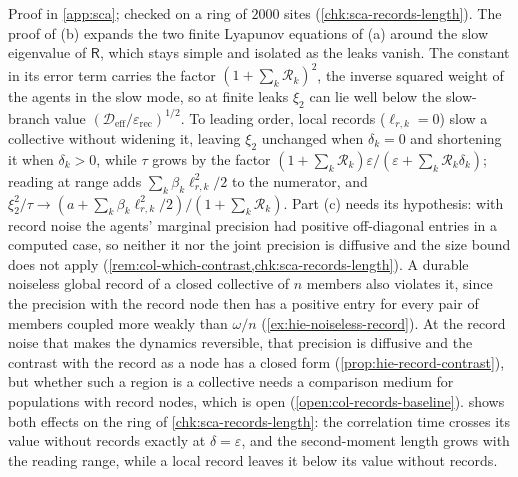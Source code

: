 Proof in \cref{app:sca}; checked on a ring of $2000$ sites (\cref{chk:sca-records-length}). The proof of (b) expands the two finite Lyapunov equations of (a) around the slow eigenvalue of $\mathsf R$, which stays simple and isolated as the leaks vanish. The constant in its error term carries the factor $(1+\sum_k\mathcal R_k)^2$, the inverse squared weight of the agents in the slow mode, so at finite leaks $\xi_2$ can lie well below the slow-branch value $(\mathcal D_{\mathrm{eff}}/\varepsilon_{\mathrm{rec}})^{1/2}$. To leading order, local records ($\ell_{r,k}=0$) slow a collective without widening it, leaving $\xi_2$ unchanged when $\delta_k=0$ and shortening it when $\delta_k>0$, while $\tau$ grows by the factor $(1+\sum_k\mathcal R_k)\varepsilon/(\varepsilon+\sum_k\mathcal R_k\delta_k)$; reading at range adds $\sum_k\beta_k\ell_{r,k}^2/2$ to the numerator, and $\xi_2^2/\tau\to(a+\sum_k\beta_k\ell_{r,k}^2/2)/(1+\sum_k\mathcal R_k)$. Part (c) needs its hypothesis: with record noise the agents' marginal precision had positive off-diagonal entries in a computed case, so neither it nor the joint precision is diffusive and the size bound does not apply (\cref{rem:col-which-contrast,chk:sca-records-length}). A durable noiseless global record of a closed collective of $n$ members also violates it, since the precision with the record node then has a positive entry for every pair of members coupled more weakly than $\omega/n$ (\cref{ex:hie-noiseless-record}). At the record noise that makes the dynamics reversible, that precision is diffusive and the contrast with the record as a node has a closed form (\cref{prop:hie-record-contrast}), but whether such a region is a collective needs a comparison medium for populations with record nodes, which is open (\cref{open:col-records-baseline}).  shows both effects on the ring of \cref{chk:sca-records-length}: the correlation time crosses its value without records exactly at $\delta=\varepsilon$, and the second-moment length grows with the reading range, while a local record leaves it below its value without records.

